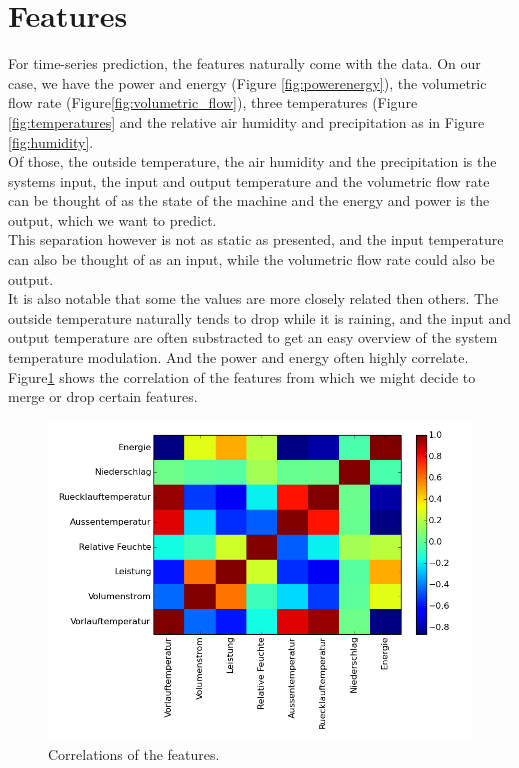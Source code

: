 \documentclass{scrartcl}
\begin{document}
\section{Features}
For time-series prediction, the features naturally come with the data. On our case, we have the power and energy (Figure \ref{fig:powerenergy}), the volumetric flow rate (Figure\ref{fig:volumetric_flow}), three temperatures (Figure \ref{fig:temperatures} and the relative air humidity and precipitation as in Figure \ref{fig:humidity}.\\
Of those, the outside temperature, the air humidity and the precipitation is the systems input, the input and output temperature and the volumetric flow rate can be thought of as the state of the machine and the energy and power is the output, which we want to predict.\\
This separation however is not as static as presented, and the input temperature can also be thought of as an input, while the volumetric flow rate could also be output.\\
It is also notable that some the values are more closely related then others. The outside temperature naturally tends to drop while it is raining, and the input and output temperature are often substracted to get an easy overview of the system temperature modulation. And the power and energy often highly correlate. Figure\ref{fig:correlate} shows the correlation of the features from which we might decide to merge or drop certain features.

\begin{figure}[H]
  \centering
  \includegraphics[width=0.5\linewidth]{img/corrmatrix.png}
  \caption[This is needed]{Correlations of the features.\footnotemark}
  \label{fig:correlate}
\end{figure}
\end{document}
